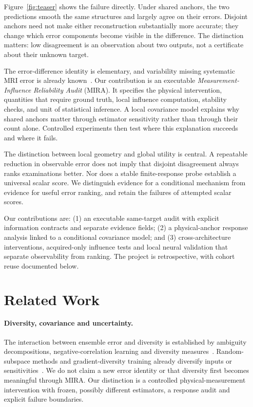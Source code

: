 \documentclass[10pt,twocolumn,letterpaper]{article}
\begin{document}
Figure~\ref{fig:teaser} shows the failure directly. Under shared anchors, the two predictions smooth the same structures and largely agree on their errors. Disjoint anchors need not make either reconstruction substantially more accurate; they change which error components become visible in the difference. The distinction matters: low disagreement is an observation about two outputs, not a certificate about their unknown target.

The error-difference identity is elementary, and variability missing systematic MRI error is already known~\cite{hu2021predict}. Our contribution is an executable \emph{Measurement-Influence Reliability Audit} (MIRA). It specifies the physical intervention, quantities that require ground truth, local influence computation, stability checks, and unit of statistical inference. A local covariance model explains why shared anchors matter through estimator sensitivity rather than through their count alone. Controlled experiments then test where this explanation succeeds and where it fails.

The distinction between local geometry and global utility is central. A repeatable reduction in observable error does not imply that disjoint disagreement always ranks examinations better. Nor does a stable finite-response probe establish a universal scalar score. We distinguish evidence for a conditional mechanism from evidence for useful error ranking, and retain the failures of attempted scalar scores.

Our contributions are: (1) an executable same-target audit with explicit information contracts and separate evidence fields; (2) a physical-anchor response analysis linked to a conditional covariance model; and (3) cross-architecture interventions, acquired-only influence tests and local neural validation that separate observability from ranking. The project is retrospective, with cohort reuse documented below.

\section{Related Work}
\paragraph{Diversity, covariance and uncertainty.}
The interaction between ensemble error and diversity is established by ambiguity decompositions, negative-correlation learning and diversity measures~\cite{krogh1994ensembles,liu1999negative,kuncheva2003diversity,brown2005diversity,ortega2022diversity}. Random-subspace methods and gradient-diversity training already diversify inputs or sensitivities~\cite{ho1998subspace,kariyappa2019diversity}. We do not claim a new error identity or that diversity first becomes meaningful through MIRA. Our distinction is a controlled physical-measurement intervention with frozen, possibly different estimators, a response audit and explicit failure boundaries.
\end{document}
